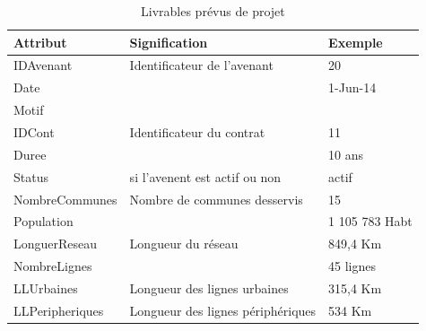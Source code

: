 \documentclass[a4paper]{report}
\begin{document}
\begin{doublespace}
	\begin{table}[H]
		\begin{center}
			\begin{tabularx}{17.5cm}{|X|X|X|}
				\hline
				\textbf{Attribut} & \textbf{Signification}            &
				\textbf{Exemple}                                                       \\
				\hline
				IDAvenant         & Identificateur de l'avenant       & 20             \\
				\hline
				Date              &                                   & 1-Jun-14       \\
				\hline
				Motif             &                                   &                \\
				\hline
				IDCont            & Identificateur du contrat         & 11             \\
				\hline
				Duree             &                                   & 10 ans         \\
				\hline
				Status            & si l'avenent est actif ou non     & actif          \\
				\hline
				NombreCommunes    & Nombre de communes desservis      & 15             \\
				\hline
				Population        &                                   & 1 105 783 Habt \\
				\hline
				LonguerReseau     & Longueur du réseau                & 849,4 Km       \\
				\hline
				NombreLignes      &                                   & 45 lignes      \\
				\hline
				LLUrbaines        & Longueur des lignes urbaines      & 315,4 Km       \\
				\hline
				LLPeripheriques   & Longueur des lignes périphériques & 534
				Km                                                                     \\
				\hline
			\end{tabularx}
			\caption{Livrables prévus de projet}
		\end{center}
	\end{table}
	

\end{doublespace}
\end{document}
